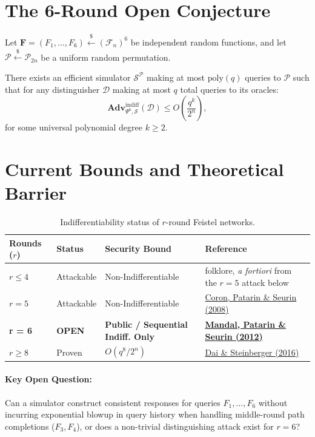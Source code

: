 \documentclass{aicr-conjecture}
\begin{document}
\section{The 6-Round Open Conjecture}

\begin{conjecture}
Let $\mathbf{F} = (F_1, \dots, F_6) \stackrel{\$}{\leftarrow} (\mathcal{F}_n)^6$ be independent random functions, and let $\mathcal{P} \stackrel{\$}{\leftarrow} \mathcal{P}_{2n}$ be a uniform random permutation.

There exists an efficient simulator $\mathcal{S}^{\mathcal{P}}$ making at most $\mathrm{poly}(q)$ queries to $\mathcal{P}$ such that for any distinguisher $\mathcal{D}$ making at most $q$ total queries to its oracles:
\begin{equation}
\mathbf{Adv}_{\Psi^6, \mathcal{S}}^{\mathrm{indiff}}(\mathcal{D}) \le O\left( \frac{q^k}{2^n} \right),
\end{equation}
for some universal polynomial degree $k \ge 2$.
\end{conjecture}

\section{Current Bounds and Theoretical Barrier}

\begin{table}[h!]
\centering
\small
\begin{tabularx}{\textwidth}{@{}llXX@{}}
\toprule
\textbf{Rounds ($r$)} & \textbf{Status} & \textbf{Security Bound} & \textbf{Reference} \\ \midrule
$r \le 4$ & Attackable & Non-Indifferentiable & folklore, \emph{a fortiori} from the $r=5$ attack below \\
$r = 5$ & Attackable & Non-Indifferentiable & \href{https://eprint.iacr.org/2008/246}{Coron, Patarin \& Seurin (2008)} \\
\textbf{r = 6} & \textbf{OPEN} & \textbf{Public / Sequential Indiff. Only} & \href{https://eprint.iacr.org/2011/496}{\textbf{Mandal, Patarin \& Seurin (2012)}} \\
$r \ge 8$ & Proven & $O(q^8/2^n)$ & \href{https://eprint.iacr.org/2015/1069}{Dai \& Steinberger (2016)} \\ \bottomrule
\end{tabularx}
\caption{Indifferentiability status of $r$-round Feistel networks.}
\end{table}

\paragraph{Key Open Question:}
Can a simulator construct consistent responses for queries $F_1, \dots, F_6$ without incurring exponential blowup in query history when handling middle-round path completions ($F_3, F_4$), or does a non-trivial distinguishing attack exist for $r=6$?
\end{document}

